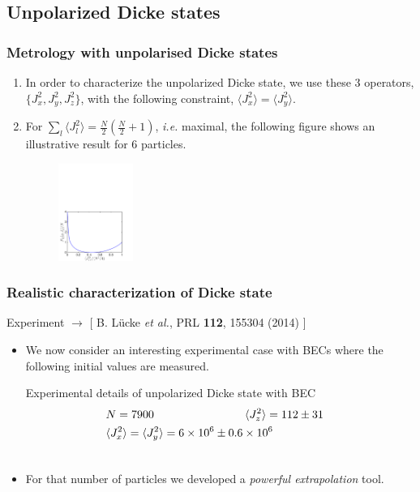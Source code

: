 \documentclass{beamer}
\newcommand{\expect}[1]{\ensuremath{\langle #1 \rangle}}
\newcommand{\citate}[1]{{\footnotesize{\color{gray}[ #1 ]}}

	}
\def\bea{\begin{eqnarray}}
\def\eea{\end{eqnarray}}
\def\nnnl{\nonumber\\}
\begin{document}
	\subsection{Unpolarized Dicke states}

		\begin{frame}
			\frametitle{Metrology with unpolarised Dicke states}
			\begin{enumerate}
				\item<1-> In order to characterize the unpolarized Dicke state, we use these 3 operators, $\{J_x^2,J_y^2,J_z^2\}$, with the following constraint, $\expect{J_x^2}=\expect{J_y^2}$.
				\item<2-> For $\sum_l \expect{J_l^2} = \tfrac{N}{2} (\tfrac{N}{2}+1)$, {\it i.e.} maximal, the following figure shows an illustrative result  for 6 particles.
				\begin{figure}
					\includegraphics[height=120px]{img/upperboundary-dicke.pdf}
				\end{figure}

			\end{enumerate}

		\end{frame}

		\begin{frame}
			\frametitle{Realistic characterization of Dicke state}
			Experiment $\rightarrow$
			\citate{B. L\"ucke {\it et al.}, PRL {\bf 112}, 155304 (2014)}

			\begin{itemize}
				\item We now consider an interesting experimental case with BECs where the following initial values are measured.
				\begin{block}{Experimental details of unpolarized Dicke state with BEC}
					\vspace{-1px}
					\bea
					 	&N = 7900 \hspace{80px} \expect{J_z^2}=112\pm 31 &\nnnl
						&\expect{J_x^2}=\expect{J_y^2}  =  6 \times 10^6 \pm 0.6\times 10^6 &\nnnl
						\nonumber
					\eea
				\end{block}

				\item For that number of particles we developed a \emph{\color{blue}powerful extrapolation} tool.
			\end{itemize}
		\end{frame}
\end{document}

